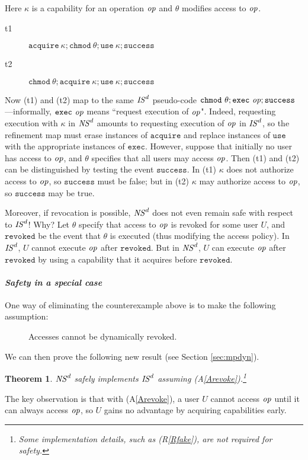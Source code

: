 \documentclass[10pt]{article}
\makeatletter
\newtheorem{theorem}{Theorem}
\newcounter{Cassums}
\newcommand{\op}{{\it op}}
\newcommand{\A}{\addtocounter{Cassums}{1}A\arabic{Cassums}\gdef\@currentlabel{\arabic{Cassums}}}
\makeatother
\begin{document}
Here $\kappa$ is a capability for an operation $\op$ and $\theta$ modifies access to $\op$. 
\begin{description}
\item[t1] $\mathtt{acquire}~\kappa;\mathtt{chmod}~\theta; \mathtt{use}~\kappa; \mathtt{success}$ 
\item[t2] $\mathtt{chmod}~\theta;\mathtt{acquire}~\kappa;\mathtt{use}~\kappa; \mathtt{success}$
\end{description}
Now (t1) and (t2) map to the same ${\it IS}^d$ pseudo-code
$\mathtt{chmod}~\theta; \mathtt{exec}~\op; \mathtt{success}$---informally, $\mathtt{exec}~\op$ means ``request execution of $\op$". Indeed, requesting execution with $\kappa$ in ${\it NS}^d$ amounts to requesting execution of $\op$ in ${\it IS}^d$, so the refinement map must erase instances of $\mathtt{acquire}$ and replace instances of $\mathtt{use}$ with the appropriate instances of $\mathtt{exec}$.
However, suppose that initially no user has access to $\op$, and $\theta$ specifies that all users may access $\op$. Then (t1) and (t2) can be distinguished by testing the event $\mathtt{success}$. In (t1) $\kappa$ does not authorize access to $\op$, so $\mathtt{success}$ must be false; but in (t2) $\kappa$ may authorize access to $\op$, so $\mathtt{success}$ may be true. 

Moreover, if revocation is possible, ${\it NS}^d$ does not even remain safe with respect to ${\it IS}^d$! Why? Let $\theta$ specify that access to $\op$ is revoked for some user $U$, and $\mathtt{revoked}$ be the event that $\theta$ is executed (thus modifying the access policy). In ${\it IS}^d$, $U$ cannot execute $\op$ after $\mathtt{revoked}$. But in ${\it NS}^d$, $U$ can execute $\op$ after $\mathtt{revoked}$ by using a capability that it acquires before $\mathtt{revoked}$.  

\paragraph{\em Safety in a special case}
One way of eliminating the counterexample above is to make the following assumption:
\begin{description}
\item[\A]\label{Arevoke} Accesses cannot be dynamically revoked.
\end{description}
We can then prove the following new result (see Section \ref{sec:mpdyn}).
\begin{theorem}
${\it NS}^d$ safely implements ${\it IS}^d$ assuming {\rm (A\ref{Arevoke})}.\footnote{Some implementation details, such as (R\ref{Rfake}), are not required for safety.} 
\end{theorem}
\noindent
The key observation is that with (A\ref{Arevoke}), a user $U$ cannot access $\op$ until it can always access $\op$, so $U$ gains no advantage by acquiring capabilities early.
\end{document}
